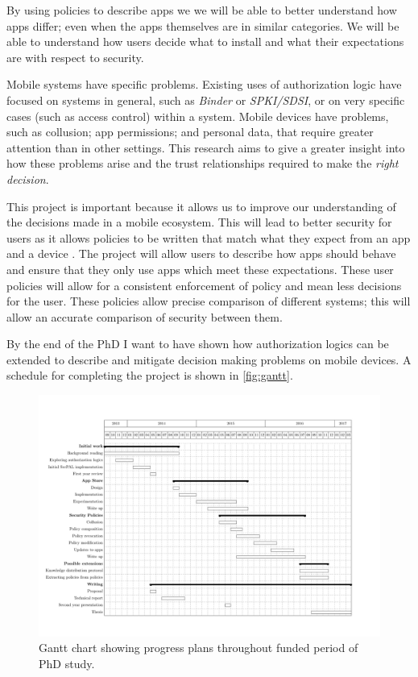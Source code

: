 \documentclass[a4paper,sfsidenotes]{%
  article%
}
\begin{document}
By using policies to describe apps we we will be able to better understand how
apps differ; even when the apps themselves are in similar categories.  We will
be able to understand how users decide what to install and what their
expectations are with respect to security.

Mobile systems have specific problems.  Existing uses of authorization logic
have focused on systems in general, such as \emph{Binder} or \emph{SPKI/SDSI},
or on very specific cases (such as access control) within a system.  Mobile
devices have problems, such as collusion; app permissions; and personal data,
that require greater attention than in other settings.  This research aims to give
a greater insight into how these problems arise and the trust relationships
required to make the \emph{right decision}.


This project is important because it allows us to improve our understanding of
the decisions made in a mobile ecosystem.  This will lead to better security for users as it allows
policies to be written that match what they expect from an app and a device .
The project will allow users to describe how apps should
behave and ensure that they only use apps which meet these expectations.  These
user policies will allow for a consistent
enforcement of policy and mean less decisions for the user.  These policies allow
precise comparison of different systems; this will allow an accurate comparison
of security between them.

By the end of the PhD I want to have shown how authorization logics can be
extended to describe and mitigate decision making problems on mobile devices.
A schedule for completing the project is shown in \autoref{fig:gantt}.

\vfill
\begin{figure}
  \includegraphics[width=1.3\linewidth,angle=90]{gantt.pdf}
  \caption{Gantt chart showing progress plans throughout funded period of PhD
  study.}\label{fig:gantt}
\end{figure}
\pagebreak


\appendix

\end{document}
